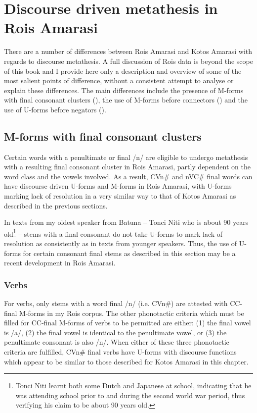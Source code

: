 \section{Discourse driven metathesis in Ro{\Q}is Amarasi}\label{sec:DisDriMetRoqAma}
There are a number of differences between Ro{\Q}is Amarasi
and Kotos Amarasi with regards to discourse metathesis.
A full discussion of Ro{\Q}is data is beyond the scope of this book
and I provide here only a description and 
overview of some of the most salient points of difference,
without a consistent attempt to analyse or explain these differences.
The main differences include the presence of M-forms with final
consonant clusters (), the use of M-forms before
connectors () and the use of U-forms before negators ().

\subsection{M-forms with final consonant clusters}\label{sec:MforFinConClu}
Certain words with a penultimate or final /n/ are eligible
to undergo metathesis with a resulting final consonant cluster
in Ro{\Q}is Amarasi, partly dependent on
the word class and the vowels involved.
As a result, CVn{\#} and nVC{\#} final words can have discourse
driven U-forms and M-forms in Ro{\Q}is Amarasi,
with U-forms marking lack of resolution
in a very similar way to that of Kotos Amarasi
as described in the previous sections.

In texts from my oldest speaker from Batuna
-- Tonci Niti who is about 90 years old\footnote{
		Tonci Niti learnt both some Dutch and
		Japanese at school, indicating that he was attending
		school prior to and during the second world war period,
		thus verifying his claim to be about 90 years old.} --
stems with a final consonant do not take U-forms
to mark lack of resolution as consistently
as in texts from younger speakers.
Thus, the use of U-forms for certain consonant
final stems as described in this section 
may be a recent development in Ro{\Q}is Amarasi.

\subsubsection{Verbs}
For verbs, only stems with a word final /n/ (i.e. CVn{\#})
are attested with CC-final M-forms in my Ro{\Q}is corpus.
The other phonotactic criteria which must be filled for
CC-final M-forms of verbs to be permitted are either:
(1) the final vowel is /a/,
(2) the final vowel is identical to the penultimate vowel,
or (3) the penultimate consonant is also /n/.
When either of these three phonotactic criteria
are fulfilled, CVn{\#} final verbs have U-forms
with discourse functions which appear to be similar
to those described for Kotos Amarasi in this chapter. 

